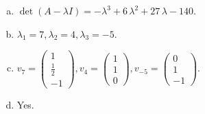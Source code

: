 \begin{questions}
\begin{solution}
\begin{enumerate}[(a)]
\item $\det(A-\lambda I)=-{\lambda}^{3} + 6 \, {\lambda}^{2} + 27 \, {\lambda} - 140$.
\item ${\lambda}_1=7, {\lambda}_2=4, {\lambda}_3=-5$.
\item $v_{7}=\left(\begin{array}{r}
1 \\
\frac{1}{2} \\
-1
\end{array}\right), v_{4}=\left(\begin{array}{r}
1 \\
1 \\
0
\end{array}\right), v_{-5}=\left(\begin{array}{r}
0 \\
1 \\
-1
\end{array}\right)$.
\item Yes.
\end{enumerate}
\end{solution}

\end{questions}

\newpage


\begin{center}
\end{center}

